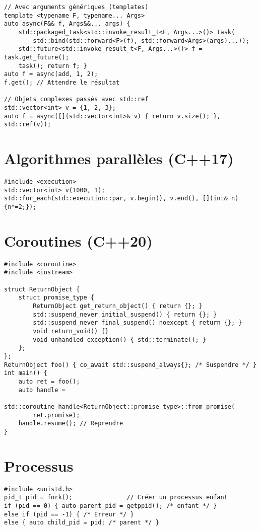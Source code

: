 \documentclass{article}
\begin{document}
\begin{multicols*}{3}
\begin{lstlisting}
// Avec arguments génériques (templates)
template <typename F, typename... Args>
auto async(F&& f, Args&&... args) {
    std::packaged_task<std::invoke_result_t<F, Args...>()> task(
        std::bind(std::forward<F>(f), std::forward<Args>(args)...));
    std::future<std::invoke_result_t<F, Args...>()> f = task.get_future();
    task(); return f; }
auto f = async(add, 1, 2);
f.get(); // Attendre le résultat

// Objets complexes passés avec std::ref
std::vector<int> v = {1, 2, 3};
auto f = async([](std::vector<int>& v) { return v.size(); }, std::ref(v));
\end{lstlisting}

\section*{Algorithmes parallèles (C++17)}

\begin{lstlisting}
#include <execution>
std::vector<int> v(1000, 1);
std::for_each(std::execution::par, v.begin(), v.end(), [](int& n){n*=2;});
\end{lstlisting}

\section*{Coroutines (C++20)}

\begin{lstlisting}
#include <coroutine>
#include <iostream>

struct ReturnObject {
    struct promise_type {
        ReturnObject get_return_object() { return {}; }
        std::suspend_never initial_suspend() { return {}; }
        std::suspend_never final_suspend() noexcept { return {}; }
        void return_void() {}
        void unhandled_exception() { std::terminate(); }
    };
};
ReturnObject foo() { co_await std::suspend_always{}; /* Suspendre */ }
int main() {
    auto ret = foo();
    auto handle =
        std::coroutine_handle<ReturnObject::promise_type>::from_promise(
        ret.promise);
    handle.resume(); // Reprendre
}
\end{lstlisting}

\section*{Processus}

\begin{lstlisting}
#include <unistd.h>
pid_t pid = fork();               // Créer un processus enfant
if (pid == 0) { auto parent_pid = getppid(); /* enfant */ }
else if (pid == -1) { /* Erreur */ }
else { auto child_pid = pid; /* parent */ }
\end{lstlisting}


\end{multicols*}
\end{document}
